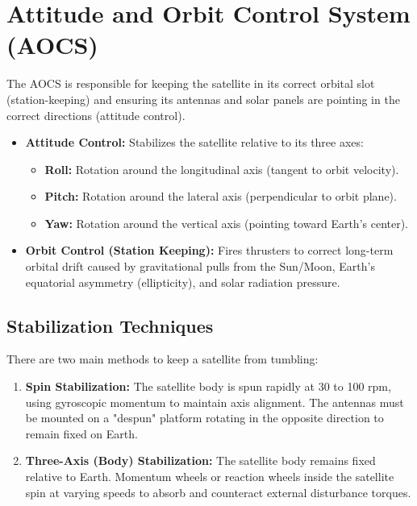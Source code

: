 \documentclass[12pt,a4paper]{article}
\begin{document}
\section{Attitude and Orbit Control System (AOCS)}

The AOCS is responsible for keeping the satellite in its correct orbital slot (station-keeping) and ensuring its antennas and solar panels are pointing in the correct directions (attitude control).

\begin{itemize}[leftmargin=*, itemsep=4pt]
  \item \textbf{Attitude Control:} Stabilizes the satellite relative to its three axes:
    \begin{itemize}[leftmargin=*, itemsep=2pt, topsep=2pt]
      \item \textbf{Roll:} Rotation around the longitudinal axis (tangent to orbit velocity).
      \item \textbf{Pitch:} Rotation around the lateral axis (perpendicular to orbit plane).
      \item \textbf{Yaw:} Rotation around the vertical axis (pointing toward Earth's center).
    \end{itemize}
  \item \textbf{Orbit Control (Station Keeping):} Fires thrusters to correct long-term orbital drift caused by gravitational pulls from the Sun/Moon, Earth's equatorial asymmetry (ellipticity), and solar radiation pressure.
\end{itemize}

\subsection{Stabilization Techniques}
There are two main methods to keep a satellite from tumbling:
\begin{enumerate}[label=\textbf{\arabic*.}, leftmargin=*, itemsep=2pt]
  \item \textbf{Spin Stabilization:} The satellite body is spun rapidly at 30 to 100 rpm, using gyroscopic momentum to maintain axis alignment. The antennas must be mounted on a "despun" platform rotating in the opposite direction to remain fixed on Earth.
  \item \textbf{Three-Axis (Body) Stabilization:} The satellite body remains fixed relative to Earth. Momentum wheels or reaction wheels inside the satellite spin at varying speeds to absorb and counteract external disturbance torques.
\end{enumerate}
\end{document}
